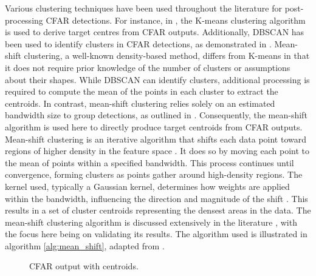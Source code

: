 Various clustering techniques have been used throughout the literature for post-processing CFAR detections. For instance, in \cite{kuang2020applied}, the K-means clustering algorithm is used to derive target centres from \ac{CFAR} outputs. Additionally, \ac{DBSCAN} has been used to identify clusters in \ac{CFAR} detections, as demonstrated in \cite{li2024density,schubert2015clustering}. Mean-shift clustering, a well-known density-based method, differs from K-means in that it does not require prior knowledge of the number of clusters or assumptions about their shapes. While \ac{DBSCAN} can identify clusters, additional processing is required to compute the mean of the points in each cluster to extract the centroids. In contrast, mean-shift clustering relies solely on an estimated bandwidth size to group detections, as outlined in \cite{derpanis2005mean}. Consequently, the mean-shift algorithm is used here to directly produce target centroids from \ac{CFAR} outputs.
\newline
\newline
Mean-shift clustering is an iterative algorithm that shifts each data point toward regions of higher density in the feature space \cite{cheng1995mean}. It does so by moving each point to the mean of points within a specified bandwidth. This process continues until convergence, forming clusters as points gather around high-density regions. The kernel used, typically a Gaussian kernel, determines how weights are applied within the bandwidth, influencing the direction and magnitude of the shift \cite{cariou2022novel}. This results in a set of cluster centroids representing the densest areas in the data. The mean-shift clustering algorithm is discussed extensively in the literature \cite{cariou2022novel,wu2007mean}, with the focus here being on validating its results. The algorithm used is illustrated in algorithm \ref{alg:mean_shift}, adapted from \cite{carreira2015review}. 
\newline 
\newline
\begin{figure}[H]
    \centering
    
    \caption{CFAR output with centroids.}
    \label{fig:cfar_centers}
\end{figure}
